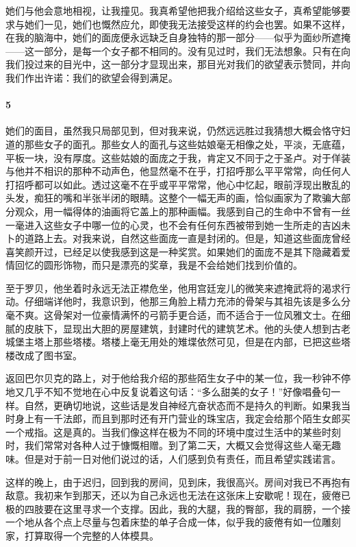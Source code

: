 \par 她们与他会意地相视，让我撞见。我真希望他把我介绍给这些女子，真希望能够要求与她们一见，她们也慨然应允，即使我无法接受这样的约会也罢。如果不这样，在我的脑海中，她们的面庞便永远缺乏自身独特的那一部分——似乎为面纱所遮掩——这一部分，是每一个女子都不相同的。没有见过时，我们无法想象。只有在向我们投过来的目光中，这一部分才显现出来，那目光对我们的欲望表示赞同，并向我们作出许诺：我们的欲望会得到满足。


\paragraph*{5}

\par 她们的面目，虽然我只局部见到，但对我来说，仍然远远胜过我猜想大概会恪守妇道的那些女子的面孔。那些女人的面孔与这些姑娘毫无相像之处，平淡，无底蕴，平板一块，没有厚度。这些姑娘的面庞之于我，肯定又不同于之于圣卢。对于佯装与他并不相识的那种不动声色，他显然毫不在乎，打招呼那么平平常常，向任何人打招呼都可以如此。透过这毫不在乎或平平常常，他心中忆起，眼前浮现出散乱的头发，痴狂的嘴和半张半闭的眼睛。这整个一幅无声的画，恰似画家为了欺骗大部分观众，用一幅得体的油画将它盖上的那种画幅。我感到自己的生命中不曾有一丝一毫进入这些女子中哪一位的心灵，也不会有任何东西被带到她一生所走的吉凶未卜的道路上去。对我来说，自然这些面庞一直是封闭的。但是，知道这些面庞曾经喜笑颜开过，已经足以使我感到这是一种奖赏。如果她们的面庞不是其下隐藏着爱情回忆的圆形饰物，而只是漂亮的奖章，我是不会给她们找到价值的。
\par 至于罗贝，他坐着时永远无法正襟危坐，他用宫廷宠儿的微笑来遮掩武将的渴求行动。仔细端详他时，我意识到，他那三角脸上精力充沛的骨架与其祖先该是多么分毫不爽。这骨架对一位豪情满怀的弓箭手更合适，而不适合于一位风雅文士。在细腻的皮肤下，显现出大胆的房屋建筑，封建时代的建筑艺术。他的头使人想到古老城堡主塔上那些塔楼。塔楼上毫无用处的雉堞依然可见，但是在内部，已把这些塔楼改成了图书室。
\par 返回巴尔贝克的路上，对于他给我介绍的那些陌生女子中的某一位，我一秒钟不停地又几乎不知不觉地在心中反复说着这句话：“多么甜美的女子！”好像唱叠句一样。自然，更确切地说，这些话是发自神经亢奋状态而不是持久的判断。如果我当时身上有一千法郎，而且到那时还有开门营业的珠宝店，我定会给那个陌生女郎买一个戒指。这是真的。当我们像这样在极为不同的环境中度过生活中的某些时刻时，我们常常对各种人过于慷慨相赠。到了第二天，大概又会觉得这些人毫无趣味。但是对于前一日对他们说过的话，人们感到负有责任，而且希望实践诺言。
\par 这样的晚上，由于迟归，回到我的房间，见到床，我很高兴。房间对我已不再抱有敌意。我初来乍到那天，还以为自己永远也无法在这张床上安歇呢！现在，疲倦已极的四肢要在这里寻求一个支撑。因此，我的大腿，我的臀部，我的肩膀，一个接一个地从各个点上尽量与包着床垫的单子合成一体，似乎我的疲倦有如一位雕刻家，打算取得一个完整的人体模具。
